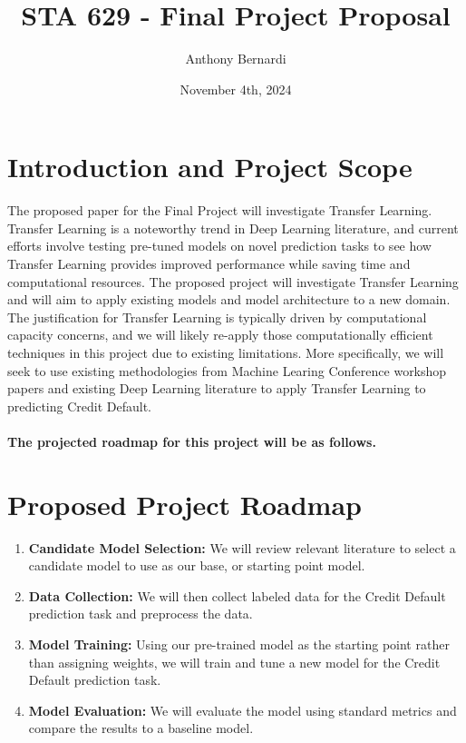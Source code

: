 \documentclass[12pt, letterpaper]{article}
\title{STA 629 - Final Project Proposal}
\author{Anthony Bernardi}
\date{November 4th, 2024}
\begin{document}
\maketitle

\section{Introduction and Project Scope}

The proposed paper for the Final Project will investigate Transfer Learning. Transfer Learning is a noteworthy trend in Deep Learning literature, and current efforts involve testing pre-tuned models on novel prediction tasks to see how Transfer Learning provides improved performance while saving time and computational resources. The proposed project will investigate Transfer Learning and will aim to apply existing models and model architecture to a new domain. 
The justification for Transfer Learning is typically driven by computational capacity concerns, and we will likely re-apply those computationally efficient techniques in this project due to existing limitations.  
More specifically, we will seek to use existing methodologies from Machine Learing Conference workshop papers and existing Deep Learning literature to apply Transfer Learning to predicting Credit Default.
\paragraph*{The projected roadmap for this project will be as follows.}

\section{Proposed Project Roadmap}

\begin{enumerate}
  \item \textbf{Candidate Model Selection:} We will review relevant literature to select a candidate model to use as our base, or starting point model. 
  \item \textbf{Data Collection:} We will then collect labeled data for the Credit Default prediction task and preprocess the data. 
  \item \textbf{Model Training:} Using our pre-trained model as the starting point rather than assigning weights, we will train and tune a new model for the Credit Default prediction task. 
  \item \textbf{Model Evaluation:} We will evaluate the model using standard metrics and compare the results to a baseline model. 
\end{enumerate}
\end{document}
